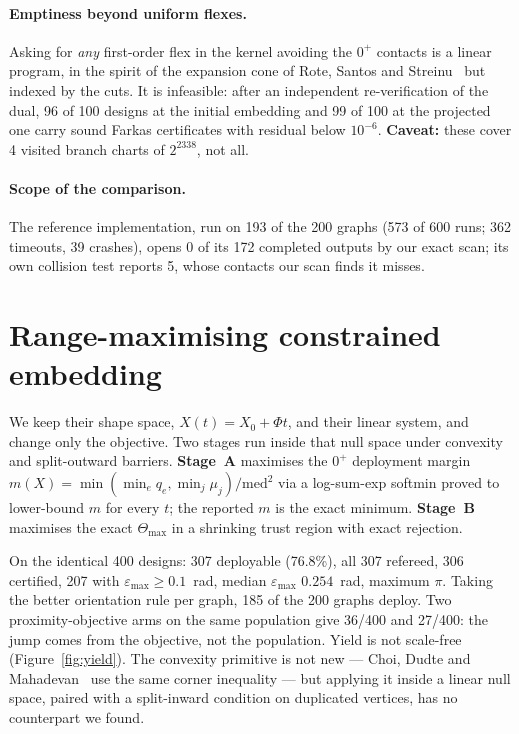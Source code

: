 \documentclass[sigconf,screen]{acmart}
\begin{document}
\paragraph{Emptiness beyond uniform flexes.} Asking for \emph{any} first-order
flex in the kernel avoiding the $0^{+}$ contacts is a linear program, in the
spirit of the expansion cone of Rote, Santos and Streinu~\cite{Rote2003} but
indexed by the cuts. It is infeasible: after an independent re-verification of
the dual, 96 of 100 designs at the initial embedding and 99 of
100 at the projected one carry sound Farkas certificates with residual below
$10^{-6}$. \textbf{Caveat:} these cover 4 visited branch charts of $2^{2338}$,
not all.

\paragraph{Scope of the comparison.} The reference implementation, run on 193 of
the 200 graphs (573 of 600 runs; 362 timeouts, 39 crashes), opens 0 of its 172
completed outputs by our exact scan; its own collision test reports 5, whose
contacts our scan finds it misses.

\section{Range-maximising constrained embedding}

We keep their shape space, $X(t)=X_0+\Phi t$, and their linear system, and change
only the objective. Two stages run inside that null space under convexity and
split-outward barriers. \textbf{Stage~A} maximises the $0^{+}$ deployment margin
$m(X)=\min(\min_e q_e,\min_j \mu_j)/\mathrm{med}^2$ via a log-sum-exp softmin
proved to lower-bound $m$ for every $t$; the reported $m$ is the exact minimum.
\textbf{Stage~B} maximises the exact $\Theta_{\max}$ in a shrinking trust region
with exact rejection.

On the identical 400 designs: 307 deployable (76.8\%), all 307 refereed, 306
certified, 207 with $\varepsilon_{\max}\ge0.1$~rad, median $\varepsilon_{\max}$
$0.254$~rad, maximum $\pi$. Taking the better orientation rule per graph, 185 of
the 200 graphs deploy. Two proximity-objective arms on the same population give
36/400 and 27/400: the jump comes from the objective, not the population. Yield is not scale-free (Figure~\ref{fig:yield}). The
convexity primitive is not new --- Choi, Dudte and Mahadevan~\cite{Choi2019} use
the same corner inequality --- but applying it inside a linear null space, paired
with a split-inward condition on duplicated vertices, has no counterpart we found.
\end{document}
